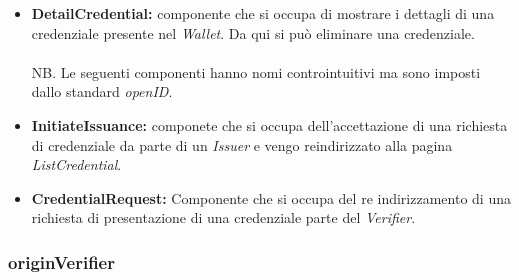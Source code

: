 \begin{itemize}
    \item \textbf{DetailCredential:} componente che si occupa di mostrare i dettagli di una credenziale presente nel \textit{Wallet}. Da qui si può eliminare una credenziale.\\
    \\NB. Le seguenti componenti hanno nomi controintuitivi ma sono imposti dallo standard \textit{openID}.
    \item \textbf{InitiateIssuance:} componete che si  occupa dell'accettazione di una richiesta di credenziale da parte di un \textit{Issuer} e vengo reindirizzato alla pagina \textit{ListCredential}.
    \item \textbf{CredentialRequest:} Componente che si occupa del re indirizzamento di una richiesta di presentazione di una credenziale parte del \textit{Verifier}. 
\end{itemize}
\subsubsection{originVerifier}

